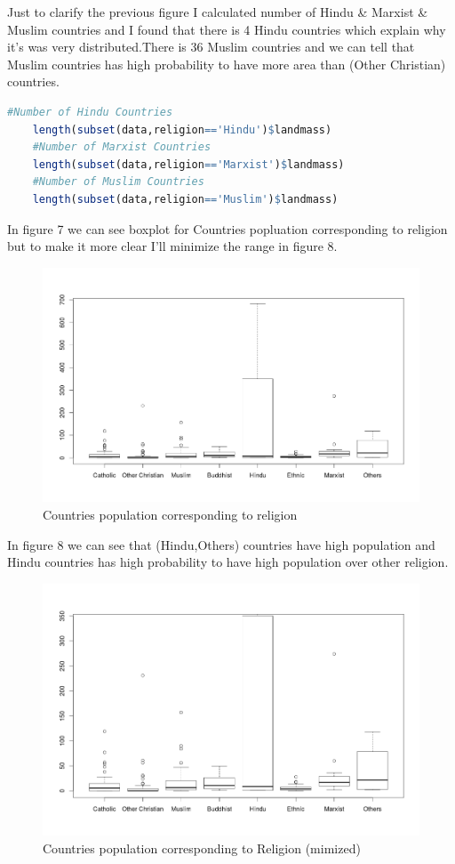 \documentclass{article}
\begin{document}
	Just to clarify the previous figure I calculated number of Hindu \& Marxist \& Muslim countries and I found that there is 4 Hindu countries which explain why it's was very distributed.There is 36 Muslim countries and we can tell that Muslim countries has high probability to have more area than (Other Christian) countries.
	\begin{lstlisting}[language=R]
	#Number of Hindu Countries
	length(subset(data,religion=='Hindu')$landmass)
	#Number of Marxist Countries
	length(subset(data,religion=='Marxist')$landmass)
	#Number of Muslim Countries
	length(subset(data,religion=='Muslim')$landmass)
	\end{lstlisting}
	In figure 7 we can see boxplot for Countries popluation corresponding to religion but to make it more clear I'll minimize the range in figure 8.
	\begin{figure}[H]
		\begin{center}
			\includegraphics[scale=0.5]{boxplotpopulationvsreligion.png}
		\end{center}
		\caption{Countries population corresponding to religion}
	\end{figure}
	In figure 8 we can see that (Hindu,Others) countries have high population and Hindu countries has high probability to have high population over other religion.
	\begin{figure}[H]
		\begin{center}
			\includegraphics[scale=0.5]{boxplotpopulationvsreligionminimized.png}
		\end{center}
		\caption{Countries population corresponding to Religion (mimized)}
	\end{figure}
\end{document}

